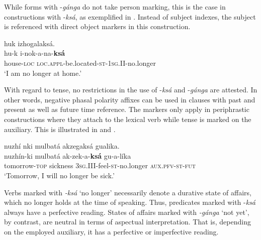 \documentclass[output=paper,colorlinks,citecolor=brown]{langscibook}
\begin{document}
While forms with -\textit{gánga} do not take person marking, this is the case in constructions with -\textit{ksá}, as exemplified in . Instead of subject indexes, the subject is referenced with direct object markers in this construction.

\ea\label{ex:kog:23} huk izhogalaksá.\\
    \gll  hu-k i-nok{}-a-na-\textbf{ksá}\\ 
          house-\textsc{loc} \textsc{loc.appl}{}-be.located-\textsc{st{}-1sg.II{}-}no.longer\\
    \glt  ‘I am no longer at home.’
\z 

With regard to tense, no restrictions in the use of -\textit{ksá} and -\textit{gánga} are attested. In other words, negative phasal polarity affixes can be used in clauses with past and present as well as future time reference. The markers only apply in periphrastic constructions where they attach to the lexical verb while tense is marked on the auxiliary. This is illustrated in  and .

\ea\label{ex:kog:24} nuzhí nki mulbatá akzegaksá gualika.\\
    \gll  nuzhín-ki mulbatá ak{}-zek{}-a{}-\textbf{ksá} gu-a{}-líka\\ 
          tomorrow-\textsc{top} sickness \textsc{3sg.III{}-}feel{}-\textsc{st}{}-no.longer \textsc{aux.pfv{}-st}{}-\textsc{fut}\\
    \glt ‘Tomorrow, I will no longer be sick.’
\z 


 
Verbs marked with \textit{-ksá} ‘no longer’ necessarily denote a durative state of affairs, which no longer holds at the time of speaking. Thus, predicates marked with -\textit{ksá} always have a perfective reading. States of affairs marked with \textit{{}-gánga} ‘not yet’, by contrast, are neutral in terms of aspectual interpretation. That is, depending on the employed auxiliary, it has a perfective  or imperfective  reading.
\end{document}
